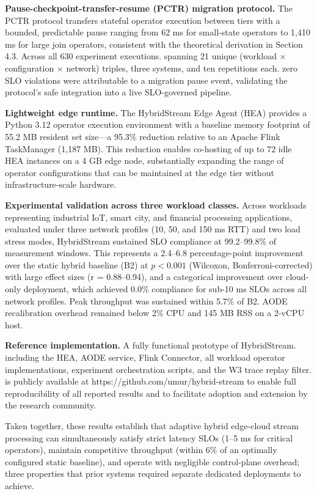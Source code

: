 \documentclass[preprint,review,12pt]{elsarticle}
\begin{document}
\textbf{Pause-checkpoint-transfer-resume (PCTR) migration protocol.} The PCTR protocol transfers stateful operator execution between tiers with a bounded, predictable pause ranging from 62 ms for small-state operators to 1,410 ms for large join operators, consistent with the theoretical derivation in Section 4.3. Across all 630 experiment executions. spanning 21 unique (workload $\times$ configuration $\times$ network) triples, three systems, and ten repetitions each. zero SLO violations were attributable to a migration pause event, validating the protocol's safe integration into a live SLO-governed pipeline.

\textbf{Lightweight edge runtime.} The HybridStream Edge Agent (HEA) provides a Python 3.12 operator execution environment with a baseline memory footprint of 55.2 MB resident set size—a 95.3\% reduction relative to an Apache Flink TaskManager (1,187 MB). This reduction enables co-hosting of up to 72 idle HEA instances on a 4 GB edge node, substantially expanding the range of operator configurations that can be maintained at the edge tier without infrastructure-scale hardware.

\textbf{Experimental validation across three workload classes.} Across workloads representing industrial IoT, smart city, and financial processing applications, evaluated under three network profiles (10, 50, and 150 ms RTT) and two load stress modes, HybridStream sustained SLO compliance at 99.2--99.8\% of measurement windows. This represents a 2.4--6.8 percentage-point improvement over the static hybrid baseline (B2) at $p < 0.001$ (Wilcoxon, Bonferroni-corrected) with large effect sizes (r = 0.88--0.94), and a categorical improvement over cloud-only deployment, which achieved 0.0\% compliance for sub-10 ms SLOs across all network profiles. Peak throughput was sustained within 5.7\% of B2. AODE recalibration overhead remained below 2\% CPU and 145 MB RSS on a 2-vCPU host.

\textbf{Reference implementation.} A fully functional prototype of HybridStream. including the HEA, AODE service, Flink Connector, all workload operator implementations, experiment orchestration scripts, and the W3 trace replay filter. is publicly available at https://github.com/umur/hybrid-stream to enable full reproducibility of all reported results and to facilitate adoption and extension by the research community.

Taken together, these results establish that adaptive hybrid edge-cloud stream processing can simultaneously satisfy strict latency SLOs (1--5 ms for critical operators), maintain competitive throughput (within 6\% of an optimally configured static baseline), and operate with negligible control-plane overhead; three properties that prior systems required separate dedicated deployments to achieve.
\end{document}
